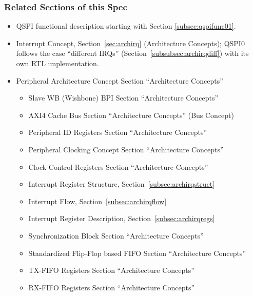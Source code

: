 \subsubsection{Related Sections of this Spec}
\begin{itemize}
  \item QSPI functional description starting with Section \ref{subsec:qspifunc01}.
  \item Interrupt Concept, Section~\ref{sec:archirq} (Architecture Concepts); QSPI0 follows the case ``different IRQs'' (Section~\ref{subsubsec:archirqdiff}) with its own RTL implementation.
  \item Peripheral Architecture Concept Section ``Architecture Concepts''
  \begin{itemize}
    \item Slave WB (Wishbone) BPI Section ``Architecture Concepts''
    \item AXI4 Cache Bus Section ``Architecture Concepts'' (Bus Concept)
    \item Peripheral ID Registers Section ``Architecture Concepts''
    \item Peripheral Clocking Concept Section ``Architecture Concepts''
    \item Clock Control Registers Section ``Architecture Concepts''
    \item Interrupt Register Structure, Section~\ref{subsec:archirqstruct}
    \item Interrupt Flow, Section~\ref{subsec:archirqflow}
    \item Interrupt Register Description, Section~\ref{subsec:archirqregs}
    \item Synchronization Block Section ``Architecture Concepts''
    \item Standardized Flip-Flop based FIFO Section ``Architecture Concepts''
    \item TX-FIFO Registers Section ``Architecture Concepts''
    \item RX-FIFO Registers Section ``Architecture Concepts''
  \end{itemize}
\end{itemize}

